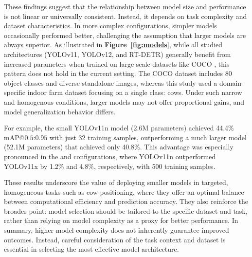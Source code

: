 These findings suggest that the relationship between model size and performance is not linear or universally consistent. Instead, it depends on task complexity and dataset characteristics. In more complex configurations, simpler models occasionally performed better, challenging the assumption that larger models are always superior. As illustrated in \textbf{Figure~\ref{fig:models}}, while all studied architectures (YOLOv11, YOLOv12, and RT-DETR) generally benefit from increased parameters when trained on large-scale datasets like COCO \cite{lin2014microsoft}, this pattern does not hold in the current setting. The COCO dataset includes 80 object classes and diverse standalone images, whereas this study used a domain-specific indoor farm dataset focusing on a single class: cows. Under such narrow and homogenous conditions, larger models may not offer proportional gains, and model generalization behavior differs.

For example, the small YOLOv11n model (2.6M parameters) achieved 44.4\% $\text{mAP@{0.5:0.95}}$ with just 32 training samples, outperforming a much larger model (52.1M parameters) that achieved only 40.8\%. This advantage was especially pronounced in the  and  configurations, where YOLOv11n outperformed YOLOv11x by 1.2\% and 4.8\%, respectively, with 500 training samples.

These results underscore the value of deploying smaller models in targeted, homogeneous tasks such as cow positioning, where they offer an optimal balance between computational efficiency and prediction accuracy. They also reinforce the broader point: model selection should be tailored to the specific dataset and task, rather than relying on model complexity as a proxy for better performance. In summary, higher model complexity does not inherently guarantee improved outcomes. Instead, careful consideration of the task context and dataset is essential in selecting the most effective model architecture.

